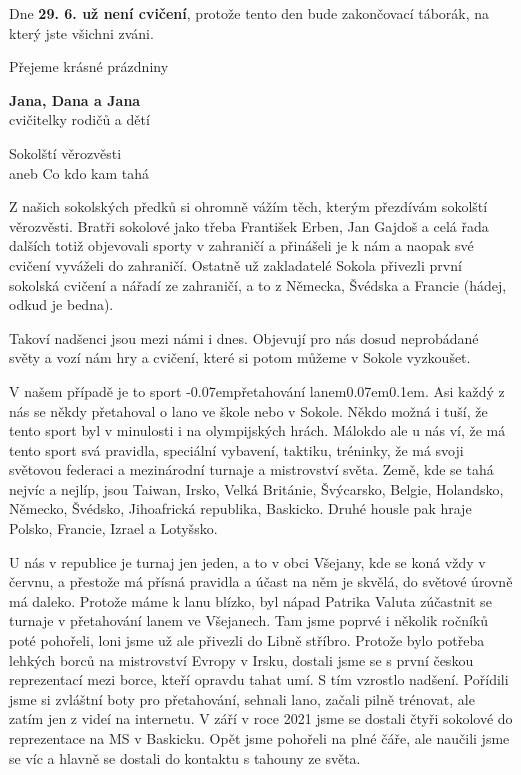 \documentclass[11pt]{article}
\newcommand{\post}[1]{%
\begin{center}
{\huge \tyrs #1}
\end{center}
}
\newcommand{\signature}[2]{%
  \begin{flushright}
    \textbf{#1}\\#2
  \end{flushright}
}
\newcommand{\luv}{\clqq\kern-0.07em}
\newcommand{\ruv}{\kern0.07em\crqq\kern0.1em}
\begin{document}
Dne \textbf{29. 6. už není cvičení}, protože tento den bude zakončovací táborák, na který jste všichni zváni.

Přejeme krásné prázdniny

\signature{Jana, Dana a Jana}{cvičitelky rodičů a dětí}

\vspace*{24pt}

\post{Sokolští věrozvěsti\\aneb Co kdo kam tahá}
Z našich sokolských předků si ohromně vážím těch, kterým přezdívám sokolští věrozvěsti. Bratři sokolové jako třeba František Erben, Jan Gajdoš a celá řada dalších totiž objevovali sporty v zahraničí a přinášeli je k nám a naopak své cvičení vyváželi do zahraničí. Ostatně už zakladatelé Sokola přivezli první sokolská cvičení a nářadí ze zahraničí, a to z Německa, Švédska a Francie (hádej, odkud je bedna).

Takoví nadšenci jsou mezi námi i dnes. Objevují pro nás dosud neprobádané světy a vozí nám hry a cvičení, které si potom můžeme v Sokole vyzkoušet.

V našem případě je to sport \luv přetahování lanem\ruv. Asi každý z nás se někdy přetahoval o lano ve škole nebo v Sokole. Někdo možná i tuší, že tento sport byl v minulosti i na olympijských hrách. Málokdo ale u nás ví, že má tento sport svá pravidla, speciální vybavení, taktiku, tréninky, že má svoji světovou federaci a mezinárodní turnaje a mistrovství světa. Země, kde se tahá nejvíc a nejlíp, jsou Taiwan, Irsko, Velká Británie, Švýcarsko, Belgie, Holandsko, Německo, Švédsko, Jihoafrická republika, Baskicko. Druhé housle pak hraje Polsko, Francie, Izrael a Lotyšsko.

U nás v republice je turnaj jen jeden, a to v obci Všejany, kde se koná vždy v červnu, a přestože má přísná pravidla a účast na něm je skvělá, do světové úrovně má daleko. Protože máme k lanu blízko, byl nápad Patrika Valuta zúčastnit se turnaje v přetahování lanem ve Všejanech. Tam jsme poprvé i několik ročníků poté pohořeli, loni jsme už ale přivezli do Libně stříbro. Protože bylo potřeba lehkých borců na mistrovství Evropy v Irsku, dostali jsme se s první českou reprezentací mezi borce, kteří opravdu tahat umí. S tím vzrostlo nadšení. Pořídili jsme si zvláštní boty pro přetahování, sehnali lano, začali pilně trénovat, ale zatím jen z videí na internetu. V září v roce 2021 jsme se dostali čtyři sokolové do reprezentace na MS v Baskicku. Opět jsme pohořeli na plné čáře, ale naučili jsme se víc a hlavně se dostali do kontaktu s tahouny ze světa.
\end{document}
